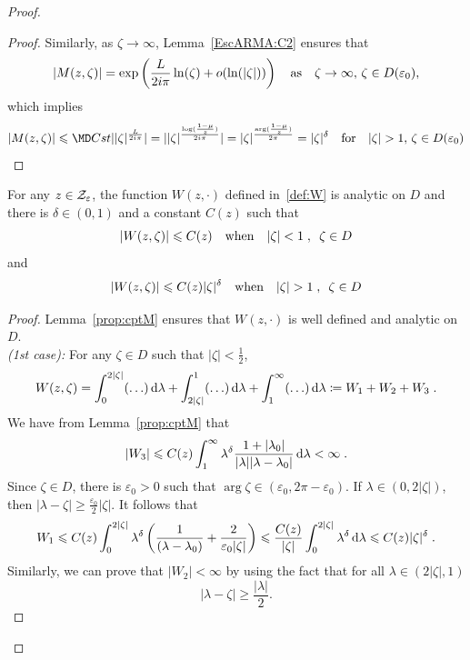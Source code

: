 \begin{proof}
\begin{proof}
Similarly, as $\zeta \to \infty$, Lemma~\ref{EscARMA:C2} ensures that 
\begin{align*}
    |M(z, \zeta)| 
    = 
    \exp\left(\frac{L}{2i\pi } \ln(\zeta) + o(\ln(|\zeta|)) \right)  \quad \text{as} \quad \zeta\to \infty,\, \zeta \in D(\varepsilon_0),
\end{align*}
which implies 
$$ \vert {M(z,\zeta)}{} \vert \leq {\MD Cst }\vert {|\zeta|^{\frac{L}{2i\pi}}}\vert=
\vert |\zeta|^{\frac{\log(\frac{1-\mu}{z})}{2i\pi}}\vert = \vert \zeta \vert^{\frac{\arg (\frac{1-\mu}{z})}{2\pi}}=\vert \zeta \vert^\delta
\mtext{for}  \vert \zeta \vert > 1,\, \zeta \in D(\varepsilon_0)$$
\end{proof}

\begin{lemma}\label{lm:cptW}For any $z \in \mathcal{Z}_\varepsilon$, the function $W(z, \cdot)$ defined in~\eqref{def:W} is analytic on $D$ and there is $\delta \in (0,1)$ and a constant $C(z)$ such that
    $$ |W(z, \zeta)| \leqslant C(z) 
    \quad \text{when} \quad |\zeta| < 1 \; , \enspace \zeta \in D$$
    and 
    $$ |W(z, \zeta)| \leqslant C(z)|\zeta|^\delta \quad \text{when} \quad |\zeta| > 1 \; , \enspace \zeta \in D$$
\end{lemma}
\begin{proof}Lemma~\ref{prop:cptM} ensures that $W(z,\cdot)$ is well defined and analytic on $D$.\\

\textit{(1st case): }For any $\zeta \in D$ such that $|\zeta| < \frac{1}{2}$, 
\begin{align*}
    W(z, \zeta) = \int_0^{2|\zeta|} (\ldots)\,\mathrm{d} \lambda + \int_{2|\zeta|}^1 (\ldots) \,\mathrm{d} \lambda + \int_1^\infty (\ldots) \,\mathrm{d} \lambda \coloneqq W_1 + W_2 + W_3 \; .
\end{align*}
We have from Lemma~\ref{prop:cptM} that
    $$ |W_3| \leqslant C(z) \int_1^\infty \lambda^\delta \frac{1+|\lambda_0|}{|\lambda||\lambda - \lambda_0|} \,\mathrm{d} \lambda < \infty \; .$$
Since $\zeta \in D$, there is $\varepsilon_0 > 0$ such that $\arg \zeta \in (\varepsilon_0, 2\pi - \varepsilon_0)$. If $\lambda \in (0, 2|\zeta|)$, then $|\lambda-\zeta| \geq \frac{\varepsilon_0}{2}|\zeta|$. It follows that 
    $$ W_1 \leqslant C(z)\int_0^{2|\zeta|} \lambda^\delta \left(\frac{1}{(\lambda-\lambda_0)}+ \frac{2}{\varepsilon_0 |\zeta|}\right) \leqslant \frac{C(z)}{|\zeta|} \int_0^{2|\zeta|} \lambda^\delta \,\mathrm{d} \lambda \leqslant C(z)|\zeta|^\delta \; .$$
Similarly, we can prove that $|W_2| < \infty$ by using the fact that for all $\lambda \in (2|\zeta|, 1)$ $$|\lambda-\zeta|\geq\frac{|\lambda|}{2}.$$


\end{proof}
\end{proof}
